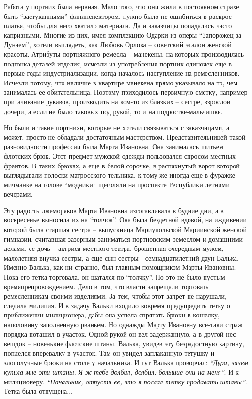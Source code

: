 Работа у портних была нервная. Мало того, что они жили в постоянном страхе быть
\enquote{застуканными} фининспектором, нужно было не ошибиться в раскрое платья, чтобы
для него хватило материала. Да и заказчицы попадались часто капризными. Многие
из них, имея комплекцию Одарки из оперы \enquote{Запорожец за Дунаем}, хотели
выглядеть, как Любовь Орлова – советский эталон женской красоты. Атрибуты
портняжного ремесла – манекены, на которых производилась подгонка деталей
изделия, исчезли из употребления портних-одиночек  еще в первые годы
индустриализации, когда началось наступление на ремесленников. Исчезли потому,
что наличие в квартире манекена прямо указывало на то, чем занималась ее
обитательница. Поэтому приходилось первичную сметку, например притачивание
рукавов, производить на ком-то из близких – сестре, взрослой дочери, а если не
было таковых под рукой, то и на подростке-мальчишке.

Но были и такие портнихи, которые не хотели связываться с заказчицами, а может,
просто не обладали достаточным мастерством. Представительницей такой
разновидности профессии была Марта Ивановна. Она занималась шитьем флотских
брюк. Этот предмет мужской одежды пользовался спросом местных франтов. В таких
брюках, а еще в белой сорочке, в распахнутый ворот которой выглядывали полоски
матросского тельника, к тому же иногда еще в фуражке-мичманке на голове
\enquote{модники} щеголяли на проспекте Республики летними вечерами.

Эту радость лжеморяков Марта Ивановна изготавливала в будние дни, а в
воскресенье выносила их на \enquote{толчок}. Она была бездетной вдовой, на иждивении
которой была старшая сестра – выпускница Мариупольской Мариинской женской
гимназии, считавшая зазорным заниматься портновским ремеслом и домашними
делами, ее дочь – актриса местного театра, брошенная очередным мужем,
малолетняя внучка сестры, а еще сын сестры - семнадцатилетний даун Валька.
Именно Валька, как ни странно, был главным помощником Марты Ивановны. Пока его
тетка торговала, он шатался по \enquote{толчку}. Но это не было пустым
времяпрепровождением. Дело в том, что власти запрещали торговать ремесленникам
своими изделиями. За тем, чтобы этот запрет не нарушали, следила милиция. И в
задачу Вальки входило вовремя предупредить тетку о приближении милиционера,
дабы она успела спрятать брюки в кошелку, наполовину заполненную рваньем. Но
однажды Марту Ивановну все-таки страж порядка потащил в участок. Одной рукой он
вел задержанную, а в другой нес вещдок – новенькие флотские штаны. Валька,
увидев эту безрадостную картину, поплелся вперевалку в участок. Там он увидел
заплаканную тетушку и злополучные брюки на столе у начальника. И тут Валька
проворчал: \emph{\enquote{Дура, зачем купила мне эти штаны. Я ж тебе долбил, долбил: большие
они на меня}}. И к милиционеру: \emph{\enquote{Начальник, отпусти ее, это я послал тетку
продавать штаны}}. Тетка была отпущена...

